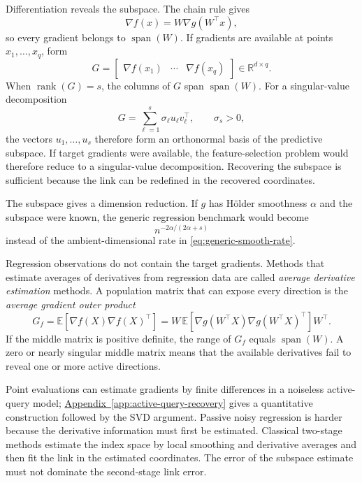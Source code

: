 \documentclass[11pt,twoside]{article}
\newcommand{\appendixref}[1]{\hyperref[#1]{Appendix~\ref*{#1}}}
\newcommand{\E}{\mathbb E}
\newcommand{\R}{\mathbb R}
\theoremstyle{definition}
\theoremstyle{remark}
\begin{document}
Differentiation reveals the subspace. The chain rule gives
\begin{equation}
 \nabla f(x)=W\nabla g(W^\top x),
 \label{eq:multi-index-gradient}
\end{equation}
so every gradient belongs to \(\operatorname{span}(W)\). If gradients are
available at points \(x_1,\ldots,x_q\), form
\begin{equation}
 G=\begin{bmatrix}
 \nabla f(x_1)&\cdots&\nabla f(x_q)
 \end{bmatrix}\in\R^{d\times q}.
 \label{eq:main-sampled-gradient-matrix}
\end{equation}
When \(\operatorname{rank}(G)=s\), the columns of \(G\) span
\(\operatorname{span}(W)\). For a singular-value decomposition
\begin{equation}
 G=\sum_{\ell=1}^s\sigma_\ell u_\ell v_\ell^\top,
 \qquad \sigma_s>0,
 \label{eq:gradient-svd}
\end{equation}
the vectors \(u_1,\ldots,u_s\) therefore form an orthonormal basis of the
predictive subspace. If target gradients were available, the feature-selection
problem would therefore reduce to a singular-value decomposition. Recovering
the subspace is sufficient because the link can be redefined in the recovered
coordinates.

The subspace gives a dimension reduction. If \(g\) has H\"older smoothness
\(\alpha\) and the subspace were known, the generic regression benchmark
would become
\begin{equation}
 n^{-2\alpha/(2\alpha+s)}
 \label{eq:intrinsic-smooth-rate}
\end{equation}
instead of the ambient-dimensional rate in
\cref{eq:generic-smooth-rate}.

Regression observations do not contain the target gradients. Methods that
estimate averages of derivatives from regression data are called
\emph{average derivative estimation} methods. A population matrix that can
expose every direction is the \emph{average gradient outer product}
\begin{equation}
 G_f=\E[\nabla f(X)\nabla f(X)^\top]
 =W\,\E[\nabla g(W^\top X)\nabla g(W^\top X)^\top]W^\top.
 \label{eq:agop}
\end{equation}
If the middle matrix is positive definite, the range of \(G_f\) equals
\(\operatorname{span}(W)\). A zero or nearly singular middle matrix means
that the available derivatives fail to reveal one or more active directions.

Point evaluations can estimate gradients by finite differences in a noiseless
active-query model; \appendixref{app:active-query-recovery} gives a
quantitative construction followed by the SVD argument. Passive noisy
regression is harder because the derivative information must first be
estimated. Classical two-stage methods estimate the
index space by local smoothing and derivative averages and then fit the link
in the estimated coordinates. The error of the subspace estimate must not
dominate the second-stage link error.
\end{document}
